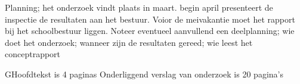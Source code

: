 			Planning;
			het onderzoek vindt plaats in maart. begin april presenteert de inspectie de resultaten aan het bestuur. Voior de meivakantie moet  het rapport bij het schoolbestuur liggen. Noteer eventueel aanvullend een deelplanning; wie doet het onderzoek; wanneer zijn de resultaten gereed; wie leest het conceptrapport
			
			GHoofdtekst is 4 paginas
			Onderliggend verslag van onderzoek is 20 pagina's
			
			
			\appendix
			
			
			
			
			
			
			
			
			
			
		
